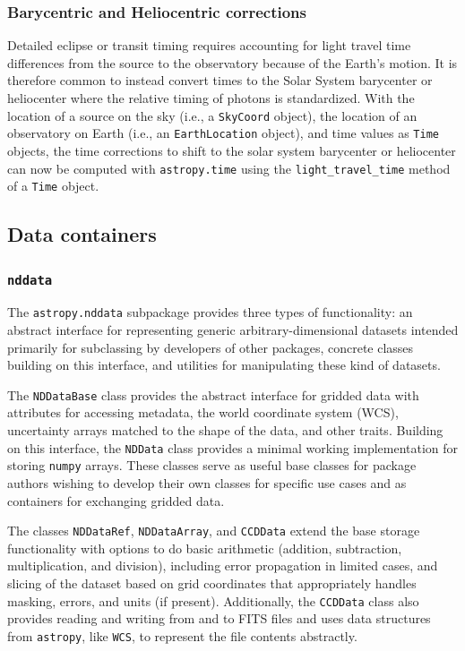 \documentclass[modern]{aastex61}
\newcommand{\package}[1]{\texttt{#1}\xspace}
\newcommand{\astropypkg}{\package{astropy}}
\begin{document}
\subsubsection{Barycentric and Heliocentric corrections}
Detailed eclipse or transit
timing requires accounting for light travel time differences from the
source to the observatory because of the Earth's motion.
It is therefore common to instead convert times to the Solar System
barycenter or heliocenter where the relative timing of photons is
standardized.
With the location of a source on the sky (i.e., a \texttt{SkyCoord}
object), the location of an observatory on Earth (i.e., an
\texttt{EarthLocation} object), and time values as \texttt{Time}
objects, the time corrections to shift to the solar system barycenter or
heliocenter can now be computed with \package{astropy.time} using the
\texttt{light\_travel\_time} method of a \texttt{Time} object.

\subsection{Data containers}

\subsubsection{\package{nddata}}

The \package{astropy.nddata} subpackage provides three types of functionality: an
abstract interface for representing generic arbitrary-dimensional datasets
intended primarily for subclassing by developers of other packages, concrete
classes building on this interface, and utilities for manipulating these kind of
datasets.

The \texttt{NDDataBase} class provides the abstract interface for gridded data
with attributes for accessing metadata, the world coordinate system (WCS),
uncertainty arrays matched to the shape of the data, and other traits.
Building on this interface, the \texttt{NDData} class provides a minimal
working implementation for storing \package{numpy} arrays. These classes serve
as useful base classes for package authors wishing to develop their own classes
for specific use cases and as containers for exchanging gridded data.

The classes \texttt{NDDataRef}, \texttt{NDDataArray}, and \texttt{CCDData}
extend the base storage functionality with options to do basic arithmetic
(addition, subtraction, multiplication, and division), including error
propagation in limited cases, and slicing of the dataset based on grid
coordinates that appropriately handles masking, errors, and units (if present).
Additionally, the \texttt{CCDData} class also provides reading and writing from
and to FITS files and uses data structures from \astropypkg, like \texttt{WCS},
to represent the file contents abstractly.
\end{document}
